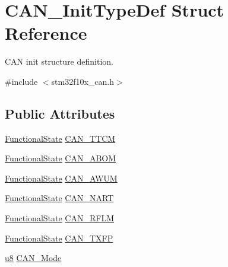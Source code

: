 \hypertarget{struct_c_a_n___init_type_def}{}\section{C\+A\+N\+\_\+\+Init\+Type\+Def Struct Reference}
\label{struct_c_a_n___init_type_def}


C\+AN init structure definition.  




{\ttfamily \#include $<$stm32f10x\+\_\+can.\+h$>$}

\subsection*{Public Attributes}
\begin{DoxyCompactItemize}
\item 
\hyperlink{agilefox_2library_2inc_2stm32f10x__type_8h_ac9a7e9a35d2513ec15c3b537aaa4fba1}{Functional\+State} \hyperlink{struct_c_a_n___init_type_def_aa53ceafdcf1a9a5c9a6566006c9a4b60}{C\+A\+N\+\_\+\+T\+T\+CM}
\item 
\hyperlink{agilefox_2library_2inc_2stm32f10x__type_8h_ac9a7e9a35d2513ec15c3b537aaa4fba1}{Functional\+State} \hyperlink{struct_c_a_n___init_type_def_a70560646c27d96ca8adc4a62d24dafd9}{C\+A\+N\+\_\+\+A\+B\+OM}
\item 
\hyperlink{agilefox_2library_2inc_2stm32f10x__type_8h_ac9a7e9a35d2513ec15c3b537aaa4fba1}{Functional\+State} \hyperlink{struct_c_a_n___init_type_def_a10f873c858a7b0efc2d0ab41524320d3}{C\+A\+N\+\_\+\+A\+W\+UM}
\item 
\hyperlink{agilefox_2library_2inc_2stm32f10x__type_8h_ac9a7e9a35d2513ec15c3b537aaa4fba1}{Functional\+State} \hyperlink{struct_c_a_n___init_type_def_a5adeac1b7b47f2b91e667eddc181ac09}{C\+A\+N\+\_\+\+N\+A\+RT}
\item 
\hyperlink{agilefox_2library_2inc_2stm32f10x__type_8h_ac9a7e9a35d2513ec15c3b537aaa4fba1}{Functional\+State} \hyperlink{struct_c_a_n___init_type_def_aa63787683c0ad533b513fb60355d76f1}{C\+A\+N\+\_\+\+R\+F\+LM}
\item 
\hyperlink{agilefox_2library_2inc_2stm32f10x__type_8h_ac9a7e9a35d2513ec15c3b537aaa4fba1}{Functional\+State} \hyperlink{struct_c_a_n___init_type_def_a003de4b70fc93b4f820f320c6ea75a16}{C\+A\+N\+\_\+\+T\+X\+FP}
\item 
\hyperlink{agilefox_2library_2inc_2stm32f10x__type_8h_aed742c436da53c1080638ce6ef7d13de}{u8} \hyperlink{struct_c_a_n___init_type_def_a88695d5132ba84354c571727cce5ad22}{C\+A\+N\+\_\+\+Mode}

\end{DoxyCompactItemize}
